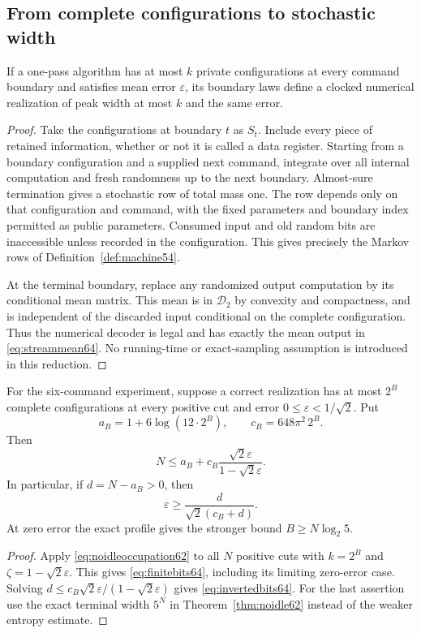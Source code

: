 \subsection{From complete configurations to stochastic width}
\begin{lemma}\label{lem:boundary64}
If a one-pass algorithm has at most $k$ private configurations at every
command boundary and satisfies mean error $\varepsilon$, its boundary
laws define a clocked numerical realization of peak width at most $k$
and the same error.
\end{lemma}
\begin{proof}
Take the configurations at boundary $t$ as $S_t$. Include every piece
of retained information, whether or not it is called a data register.
Starting from a boundary configuration and a supplied next command,
integrate over all internal computation and fresh randomness up to the
next boundary. Almost-sure termination gives a stochastic row of total
mass one. The row depends only on that configuration and command,
with the fixed parameters and boundary index permitted as public
parameters. Consumed input and old random bits are inaccessible unless
recorded in the configuration. This gives precisely the Markov rows
of Definition~\ref{def:machine54}.

At the terminal boundary, replace any randomized output computation
by its conditional mean matrix. This mean is in $\mathcal D_2$ by
convexity and compactness, and is independent of the discarded input
conditional on the complete configuration. Thus the numerical decoder
is legal and has exactly the mean output in
\eqref{eq:streammean64}. No running-time or exact-sampling assumption
is introduced in this reduction.
\end{proof}

\begin{proposition}\label{prop:bitaccuracy64}
For the six-command experiment, suppose a correct realization has at
most $2^B$ complete configurations at every positive cut and error
$0\le\varepsilon<1/\sqrt2$. Put
\[
 a_B=1+6\log(12\cdot2^B),\qquad c_B=648\pi^2\,2^B.
\]
Then
\begin{equation}\label{eq:finitebits64}
 N\le a_B+c_B\frac{\sqrt2\varepsilon}{1-\sqrt2\varepsilon}.
\end{equation}
In particular, if $d=N-a_B>0$, then
\begin{equation}\label{eq:invertedbits64}
 \varepsilon\ge\frac{d}{\sqrt2(c_B+d)}.
\end{equation}
At zero error the exact profile gives the stronger bound
$B\ge N\log_2 5$.
\end{proposition}
\begin{proof}
Apply \eqref{eq:noidleoccupation62} to all $N$ positive cuts with
$k=2^B$ and $\zeta=1-\sqrt2\varepsilon$. This gives
\eqref{eq:finitebits64}, including its limiting zero-error case.
Solving $d\le c_B\sqrt2\varepsilon/(1-\sqrt2\varepsilon)$ gives
\eqref{eq:invertedbits64}. For the last assertion use the exact
terminal width $5^N$ in Theorem~\ref{thm:noidle62} instead of the
weaker entropy estimate.
\end{proof}


